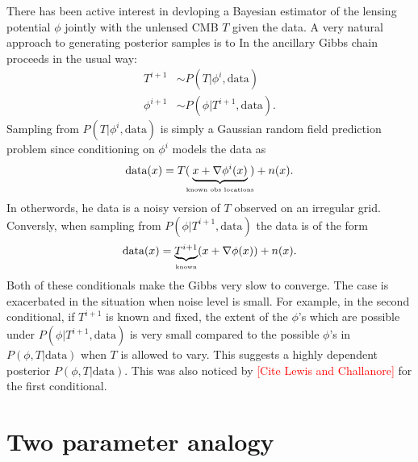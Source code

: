 \documentclass[noinfoline]{imsart}
\begin{document}
There has been active interest in devloping a Bayesian estimator of the lensing potential $\phi$ jointly with the unlensed CMB $T$ given the data. A very natural approach to generating posterior samples is to 
In the ancillary Gibbs chain proceeds in the usual way:
\begin{align}
T^{i+1}&\sim P(T |  \phi^{i},\text{data})\\
\phi^{i+1}&\sim P(\phi | T^{i+1},  \text{data}).
\end{align}
Sampling from $P(T |  \phi^{i},\text{data})$ is simply a Gaussian random field prediction problem since conditioning on $\phi^{i}$ models the data as
\[ \text{data}(x) = T(\!\!\underbrace{x+\nabla\phi^{i}(x)}_\text{\tiny known obs locations}\!\!) + n(x).\]
In otherwords, he data is a noisy version of  $T$ observed on an irregular grid. 
Conversly, when sampling from $P(\phi |  T^{i+1},\text{data})$ the data is of the form
\[ \text{data}(x) = \underbrace{T^{i+1}}_{\text{\tiny known}}(x+\nabla\phi(x)) + n(x). \]
Both of these conditionals make the Gibbs very slow to converge. The case is exacerbated in the situation when noise level is small. For example, in the second conditional, if $T^{i+1}$ is known and fixed, the extent of the  $\phi$'s which are possible under $P(\phi|T^{i+1},\text{data})$  is very small compared to the possible $\phi$'s  in $P(\phi, T| \text{data})$ when $T$ is allowed to vary. 
This suggests a highly dependent posterior $P(\phi, T| \text{data})$. 
This was also noticed by \textcolor{red}{[Cite Lewis and Challanore]} for the first conditional.









%
%
\section{Two parameter analogy}
\label{two parameter system}
\end{document}

